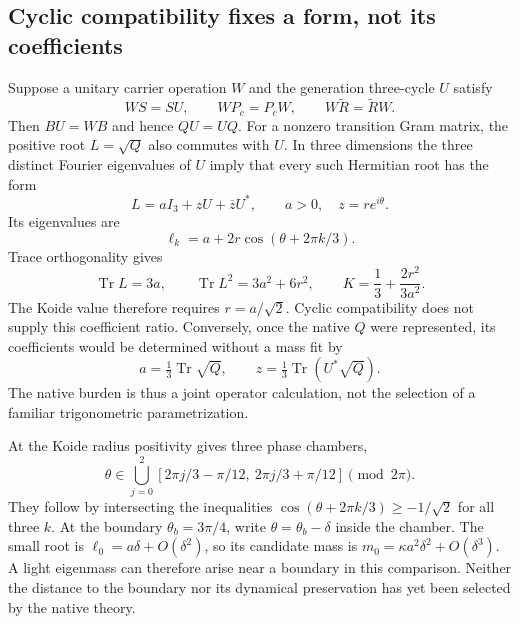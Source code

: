 \subsection{Cyclic compatibility fixes a form, not its coefficients}
Suppose a unitary carrier operation $W$ and the generation three-cycle
$U$ satisfy
\begin{equation}
 WS=SU,\qquad WP_c=P_cW,\qquad W\widetilde R=\widetilde RW.
\end{equation}
Then $BU=WB$ and hence $QU=UQ$. For a nonzero transition Gram matrix, the positive root $L=\sqrt Q$
also commutes with $U$. In three dimensions the three distinct Fourier
eigenvalues of $U$ imply that every such Hermitian root has the form
\begin{equation}
 L=aI_3+zU+\overline zU^*,\qquad a>0,\quad z=re^{i\theta}.
\end{equation}
Its eigenvalues are
\begin{equation}
 \ell_k=a+2r\cos(\theta+2\pi k/3).
\end{equation}
Trace orthogonality gives
\begin{equation}
 \operatorname{Tr}L=3a,\qquad
 \operatorname{Tr}L^2=3a^2+6r^2,\qquad
 K=\frac13+\frac{2r^2}{3a^2}.
\end{equation}
The Koide value therefore requires $r=a/\sqrt2$. Cyclic compatibility
does not supply this coefficient ratio. Conversely, once the native
$Q$ were represented, its coefficients would be determined without a
mass fit by
\begin{equation}
 a=\tfrac13\operatorname{Tr}\sqrt Q,\qquad
 z=\tfrac13\operatorname{Tr}(U^*\sqrt Q).
\end{equation}
The native burden is thus a joint operator calculation, not the
selection of a familiar trigonometric parametrization.

At the Koide radius positivity gives three phase chambers,
\begin{equation}
 \theta\in\bigcup_{j=0}^2
 [2\pi j/3-\pi/12,\ 2\pi j/3+\pi/12]
 \pmod{2\pi}.
\end{equation}
They follow by intersecting the inequalities
$\cos(\theta+2\pi k/3)\geq-1/\sqrt2$ for all three $k$.
At the boundary $\theta_b=3\pi/4$, write
$\theta=\theta_b-\delta$ inside the chamber. The small root is
$\ell_0=a\delta+O(\delta^2)$, so its candidate mass is
$m_0=\kappa a^2\delta^2+O(\delta^3)$. A light eigenmass can
therefore arise near a boundary in this comparison. Neither the
distance to the boundary nor its dynamical preservation has yet been
selected by the native theory.

